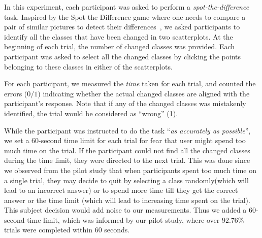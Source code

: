 \vspace{.3em}
In this experiment, each participant was asked to perform a \emph{spot-the-difference} task. Inspired by the Spot the Difference game where one needs to compare a pair of similar pictures to detect their differences~\cite{Fukuba2009}, we asked participants to identify all the classes that have been changed in two scatterplots. At the beginning of each trial, the number of changed classes was provided. Each participant was asked to select all the changed classes by clicking the points belonging to these classes in either of the scatterplots.

For each participant, we measured the \emph{time} taken for each trial, and counted the errors ($0/1$) indicating whether the actual changed classes are aligned with the participant's response. Note that if any of the changed classes was mistakenly identified, the trial would be considered as ``wrong'' (1).

While the participant was instructed to do the task ``\emph{as accurately as possible}'', we set a $60$-second time limit for each trial for fear that user might spend too much time on the trial. If the participant could not find all the changed classes during the time limit, they were directed to the next trial. %
This was done since we observed from the pilot study that when participants spent too much time on a single trial, they may decide to quit by selecting a class randomly(which will lead to an incorrect answer) or to spend more time till they get the correct answer or the time limit (which will lead to increasing time spent on the trial). This subject decision would add noise to our measurements. Thus we added a $60$-second time limit, which was informed by our pilot study, where over $92.76\%$ trials were completed within $60$ seconds.


